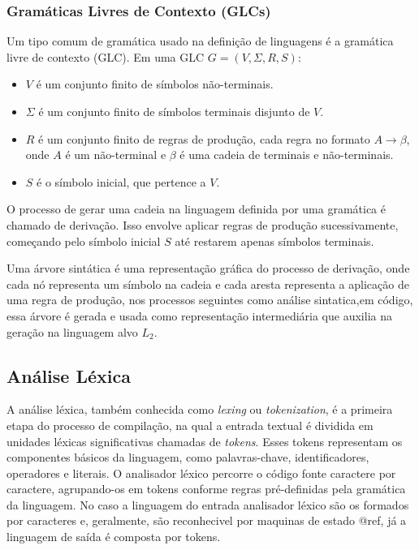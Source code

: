 \documentclass[english, 
               brazil, 
               bsc] %
               {dcomp-abntex2}
\begin{document}
\subsubsection{Gramáticas Livres de Contexto (GLCs)}

Um tipo comum de gramática usado na definição de linguagens é a gramática livre de contexto (GLC). Em uma GLC $ G=(V,\Sigma,R,S)$:

\begin{itemize}
  \item $V$ é um conjunto finito de símbolos não-terminais.

  \item $\Sigma$ é um conjunto finito de símbolos terminais disjunto de $V$.

  \item $R$ é um conjunto finito de regras de produção, cada regra no formato $A \rightarrow \beta$, onde $A$ é um não-terminal e $\beta$ é uma cadeia de terminais e não-terminais.

  \item $S$ é o símbolo inicial, que pertence a $V$.
\end{itemize}

O processo de gerar uma cadeia na linguagem definida por uma gramática é chamado de derivação. Isso envolve aplicar regras de produção sucessivamente, começando pelo símbolo inicial $S$ até restarem apenas símbolos terminais.

Uma árvore sintática é uma representação gráfica do processo de derivação, onde cada nó representa um símbolo na cadeia e cada aresta representa a aplicação de uma regra de produção, nos processos seguintes como análise sintatica,em código, essa árvore é gerada e usada como representação intermediária que auxilia na geração na linguagem alvo $L_2$.


\subsection{Análise Léxica}
A análise léxica, também conhecida como \textit{lexing} ou \textit{tokenization}, é a primeira etapa do processo de compilação, na qual a entrada textual é dividida em unidades léxicas significativas chamadas de \textit{tokens}. Esses tokens representam os componentes básicos da linguagem, como palavras-chave, identificadores, operadores e literais. O analisador léxico percorre o código fonte caractere por caractere, agrupando-os em tokens conforme regras pré-definidas pela gramática da linguagem. No caso a linguagem do entrada analisador léxico são os formados por caracteres e, geralmente, são reconhecivel por maquinas de estado @ref, já a linguagem de saída é composta por tokens.
\end{document}
